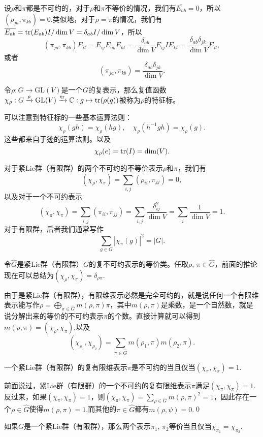 \documentclass[10pt]{article}
\newcommand{\cc}{\mathbb{C}}
\begin{document}
\para 设$\rho$和$\pi$都是不可约的，对于$\rho$和$\pi$不等价的情况，我们有$\overline{E_{ab}}=0$，所以$\left(\rho_{ja},\pi_{kb}\right)=0$.类似地，对于$\rho=\pi$的情况，我们有$\overline{E_{ab}}=\operatorname{tr}(E_{ab})I/\dim V=\delta_{ab}I/\dim V$，所以
\[
	\left(\pi_{ja},\pi_{kb}\right)E_{il}=E_{ij}\overline{E_{ab}}E_{kl}=\frac{\delta_{ab}}{\dim V}E_{ij}IE_{kl}=\frac{\delta_{ab}\delta_{jk}}{\dim V}E_{il},
\]
或者
\[
	\left(\pi_{ja},\pi_{kb}\right)=\frac{\delta_{ab}\delta_{jk}}{\dim V}.
\]

\para 令$\rho:G\to \mathrm{GL}(V)$是一个$G$的复表示，那么复值函数$\chi_\rho:G\xrightarrow{\rho}\mathrm{GL}(V)\xrightarrow{\tr}\cc:g\mapsto \tr(\rho(g))$被称为$\rho$的特征标。

可以注意到特征标的一些基本运算法则：
\[
	\chi_\rho(gh)=\chi_\rho(hg),\quad \chi_\rho(h^{-1}gh)= \chi_\rho(g).
\]
这些都来自于迹的运算法则。以及
\[
	\chi_\rho(e)=\operatorname{tr}(I)=\dim(V).
\]

\para 对于紧Lie群（有限群）的两个不可约的不等价表示$\rho$和$\pi$，我们有
\[
(\chi_\rho, \chi_\pi)=\sum_{i,j}\left(\rho_{ii},\pi_{jj}\right)=0,
\]
以及对于一个不可约表示
\[
(\chi_\pi, \chi_\pi)=\sum_{i,j}(\pi_{ii},\pi_{jj})=\sum_{i,j}\frac{\delta_{ij}^2}{\dim V}=\sum_{i}\frac{1}{\dim V}=1.
\]
对于有限群，后者我们通常写作
\[
	\sum_{g\in G} |\chi_\pi(g)|^2=|G|.
\]

令$\hat{G}$是紧Lie群（有限群）$G$的复不可约表示的等价类。任取$\rho$, $\pi\in\hat{G}$，前面的推论现在可以总结为$(\chi_\rho,\chi_\pi)=\delta_{\rho\pi}$.

由于是紧Lie群（有限群），有限维表示必然是完全可约的，就是说任何一个有限维表示能写作$\rho=\bigoplus_{\pi\in\hat{G}}m(\rho,\pi)\pi$，其中$m(\rho,\pi)$是乘数，是一个自然数，就是说分解出来的等价的不可约表示$\pi$的个数。直接计算就可以得到$m(\rho,\pi)=(\chi_\rho,\chi_\pi)$,以及
\begin{equation}
	(\chi_{\rho_1},\chi_{\rho_2})=\sum_{\pi\in\hat{G}}m(\rho_1,\pi)m(\rho_2,\pi).
\end{equation}

\pro 一个紧Lie群（有限群）的复有限维表示$\pi$是不可约的当且仅当$(\chi_{\pi},\chi_{\pi})=1$. 

\proof 前面说过，紧Lie群（有限群）的一个不可约的复有限维表示$\pi$满足$(\chi_\pi, \chi_\pi)=1$. 反过来，如果$(\chi_\pi, \chi_\pi)=1$，则$(\chi_{\pi},\chi_{\pi})=\sum_{\rho\in\hat{G}}m(\rho,\pi)^2=1$，因此存在一个$\rho\in\hat{G}$使得$m(\rho,\pi)=1$,而其他的$\pi\in\hat{G}$都有$m(\rho,\psi)=0$.\qed

\pro 如果$G$是一个紧Lie群（有限群），那么两个表示$\pi_1$, $\pi_2$等价当且仅当$\chi_{\pi_1}=\chi_{\pi_2}$.
\end{document}
